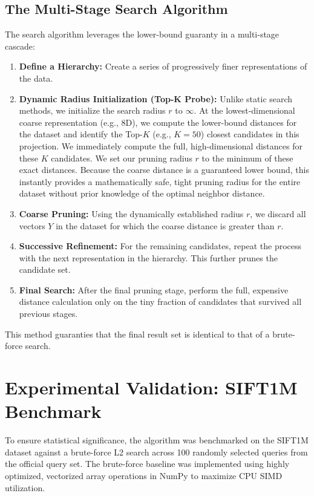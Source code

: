 \documentclass[sigconf]{acmart}
\begin{document}
\subsection{The Multi-Stage Search Algorithm}

The search algorithm leverages the lower-bound guaranty in a multi-stage cascade:
\begin{enumerate}
    \item \textbf{Define a Hierarchy:} Create a series of progressively finer representations of the data.
    \item \textbf{Dynamic Radius Initialization (Top-K Probe):} Unlike static search methods, we initialize the search radius $r$ to $\infty$. At the lowest-dimensional coarse representation (e.g., 8D), we compute the lower-bound distances for the dataset and identify the Top-$K$ (e.g., $K=50$) closest candidates in this projection. We immediately compute the full, high-dimensional distances for these $K$ candidates. We set our pruning radius $r$ to the minimum of these exact distances. Because the coarse distance is a guaranteed lower bound, this instantly provides a mathematically safe, tight pruning radius for the entire dataset without prior knowledge of the optimal neighbor distance.
    \item \textbf{Coarse Pruning:} Using the dynamically established radius $r$, we discard all vectors $Y$ in the dataset for which the coarse distance is greater than $r$.
    \item \textbf{Successive Refinement:} For the remaining candidates, repeat the process with the next representation in the hierarchy. This further prunes the candidate set.
    \item \textbf{Final Search:} After the final pruning stage, perform the full, expensive distance calculation only on the tiny fraction of candidates that survived all previous stages.
\end{enumerate}
This method guaranties that the final result set is identical to that of a brute-force search.

\section{Experimental Validation: SIFT1M Benchmark}
To ensure statistical significance, the algorithm was benchmarked on the SIFT1M dataset against a brute-force L2 search across 100 randomly selected queries from the official query set. The brute-force baseline was implemented using highly optimized, vectorized array operations in NumPy to maximize CPU SIMD utilization.
\end{document}
